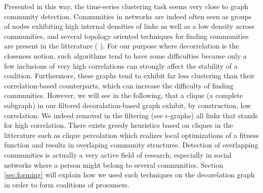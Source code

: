 \documentclass[conference]{IEEEtran}
\begin{document}
Presented in this way, the time-series clustering task seems very close to graph community detection. Communities in networks are indeed often seen as groups of nodes exhibiting high internal densities of links as well as a low density across communities, and several topology oriented techniques for finding communities are present in the litterature (\cite{Newman2013} \cite{Girvan2002} \cite{Newman2013_2}). For our purpose where decorrelation is the closeness notion, such algorithms tend to have some difficulties because only a few inclusions of very high correlations can strongly affect the stability of a coalition. Furthermore, these graphs tend to exhibit far less clustering than their correlation-based counterparts, which can increase the difficulty of finding communities. However, we will see in the following, that a clique (a complete subgraph) in our filtered decoralation-based graph exhibit, by construction, low correlation. We indeed removed in the filtering (see $\epsilon$-graphs) all links that stands for high correlation. There exists greedy heuristics based on cliques in the litterature such as clique percolation \cite{Lancichinetti} which realizes local optimizations of a fitness function and results in overlaping community structures. Detection of overlapping communities is actually a very active field of research, especially in social networks where a person might belong to several communities. Section \ref{sec:forming} will explain how we used such techniques on the decorelation graph in order to form coalitions of prosumers.


%
%
\end{document}
